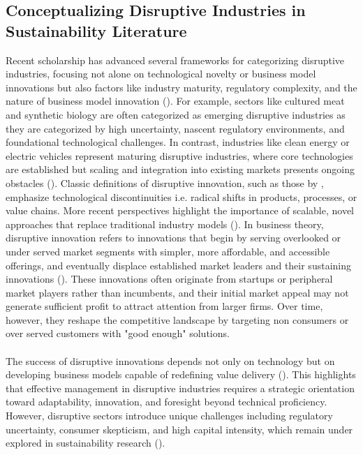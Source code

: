 	\subsection{Conceptualizing Disruptive Industries in Sustainability Literature}
	\label{sec:ConceptualizingDisruptive}
	Recent scholarship has advanced several frameworks for categorizing disruptive industries, focusing not alone on technological novelty or business model innovations but also factors like industry maturity, regulatory complexity, and the nature of business model innovation (\textcite{Tushman1986}). For example, sectors like cultured meat and synthetic biology are often categorized as emerging disruptive industries as they are categorized by high uncertainty, nascent regulatory environments, and foundational technological challenges. In contrast, industries like clean energy or electric vehicles represent maturing disruptive industries, where core technologies are established but scaling and integration into existing markets presents ongoing obstacles (\textcite{Tushman1986}). Classic definitions of disruptive innovation, such as those by \citeauthor{Tushman1986}, emphasize technological discontinuities i.e. radical shifts in products, processes, or value chains. More recent perspectives highlight the importance of scalable, novel approaches that replace traditional industry models (\textcite{Yu2010}). In business theory, disruptive innovation refers to innovations that begin by serving overlooked or under served market segments with simpler, more affordable, and accessible offerings, and eventually displace established market leaders and their sustaining innovations (\textcite{Christensen1997}). These innovations often originate from startups or peripheral market players rather than incumbents, and their initial market appeal may not generate sufficient profit to attract attention from larger firms. Over time, however, they reshape the competitive landscape by targeting non consumers or over served customers with "good enough" solutions.
	
	\paragraph*{} The success of disruptive innovations depends not only on technology but on developing business models capable of redefining value delivery (\textcite{Chesbrough2007}). This highlights that effective management in disruptive industries requires a strategic orientation toward adaptability, innovation, and foresight beyond technical proficiency. However, disruptive sectors introduce unique challenges including regulatory uncertainty, consumer skepticism, and high capital intensity, which remain under explored in sustainability research (\textcite{Wustenhagen2007}).
	

